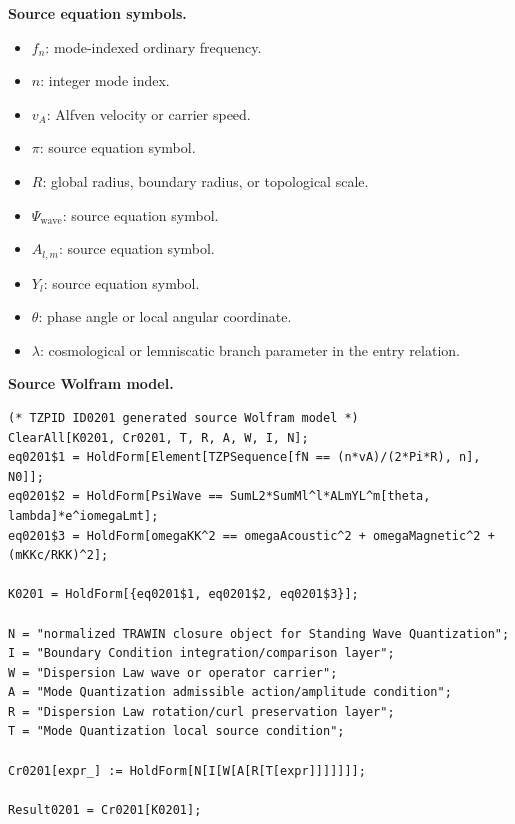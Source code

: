 \begin{minipage}[t]{0.49\linewidth}
\begingroup
\small
\raggedright
\textbf{Source equation symbols.}\par
\begin{itemize}[leftmargin=1.35em,itemsep=1pt,topsep=1pt,parsep=0pt]
    \item $f_n$: mode-indexed ordinary frequency.
    \item $n$: integer mode index.
    \item $v_A$: Alfven velocity or carrier speed.
    \item $\pi$: source equation symbol.
    \item $R$: global radius, boundary radius, or topological scale.
    \item $\Psi_{\mathrm{wave}}$: source equation symbol.
    \item $A_{l,m}$: source equation symbol.
    \item $Y_l$: source equation symbol.
    \item $\theta$: phase angle or local angular coordinate.
    \item $\lambda$: cosmological or lemniscatic branch parameter in the entry relation.
\end{itemize}
\endgroup
\end{minipage}\hfill
\begin{minipage}[t]{0.47\linewidth}
\begingroup
\scriptsize
\raggedright
\textbf{Source Wolfram model.}\par
\begin{Verbatim}[fontsize=\tiny,breaklines=true,breakanywhere=true]
(* TZPID ID0201 generated source Wolfram model *)
ClearAll[K0201, Cr0201, T, R, A, W, I, N];
eq0201$1 = HoldForm[Element[TZPSequence[fN == (n*vA)/(2*Pi*R), n], N0]];
eq0201$2 = HoldForm[PsiWave == SumL2*SumMl^l*ALmYL^m[theta, lambda]*e^iomegaLmt];
eq0201$3 = HoldForm[omegaKK^2 == omegaAcoustic^2 + omegaMagnetic^2 + (mKKc/RKK)^2];

K0201 = HoldForm[{eq0201$1, eq0201$2, eq0201$3}];

N = "normalized TRAWIN closure object for Standing Wave Quantization";
I = "Boundary Condition integration/comparison layer";
W = "Dispersion Law wave or operator carrier";
A = "Mode Quantization admissible action/amplitude condition";
R = "Dispersion Law rotation/curl preservation layer";
T = "Mode Quantization local source condition";

Cr0201[expr_] := HoldForm[N[I[W[A[R[T[expr]]]]]]];

Result0201 = Cr0201[K0201];
\end{Verbatim}
\endgroup
\end{minipage}


